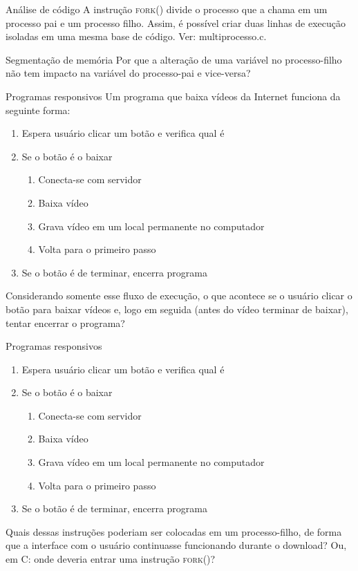 \documentclass{beamer}
\begin{document}
\begin{frame}[fragile]{Análise de código}
  \centering
  \large
  A instrução \textsc{fork()} divide o processo que a chama em um processo pai e
  um processo filho. Assim, é possível criar duas linhas de execução isoladas
  em uma mesma base de código. Ver: multiprocesso.c.
\end{frame}

\begin{frame}[fragile]{Segmentação de memória}
  \centering
  \Large
  Por que a alteração de uma variável no processo-filho não tem impacto na
  variável do processo-pai e vice-versa?
\end{frame}

\begin{frame}[fragile]{Programas responsivos}
  \centering
  \large
  Um programa que baixa vídeos da Internet funciona da seguinte forma:
  \begin{enumerate}
    \item Espera usuário clicar um botão e verifica qual é
    \item Se o botão é o baixar
      \begin{enumerate}
        \item Conecta-se com servidor
        \item Baixa vídeo
        \item Grava vídeo em um local permanente no computador
        \item Volta para o primeiro passo
      \end{enumerate}
     \item Se o botão é de terminar, encerra programa
  \end{enumerate}

  Considerando somente esse fluxo de execução, o que acontece se o usuário
  clicar o botão para baixar vídeos e, logo em seguida (antes do vídeo terminar
  de baixar), tentar encerrar o programa?
\end{frame}

\begin{frame}[fragile]{Programas responsivos}
  \centering
  \large
  \begin{enumerate}
    \item Espera usuário clicar um botão e verifica qual é
    \item Se o botão é o baixar
      \begin{enumerate}
        \item Conecta-se com servidor
        \item Baixa vídeo
        \item Grava vídeo em um local permanente no computador
        \item Volta para o primeiro passo
      \end{enumerate}
     \item Se o botão é de terminar, encerra programa
  \end{enumerate}

  Quais dessas instruções poderiam ser colocadas em um processo-filho, de forma
  que a interface com o usuário continuasse funcionando durante o download? Ou,
  em C: onde deveria entrar uma instrução \textsc{fork()}?
\end{frame}
\end{document}
